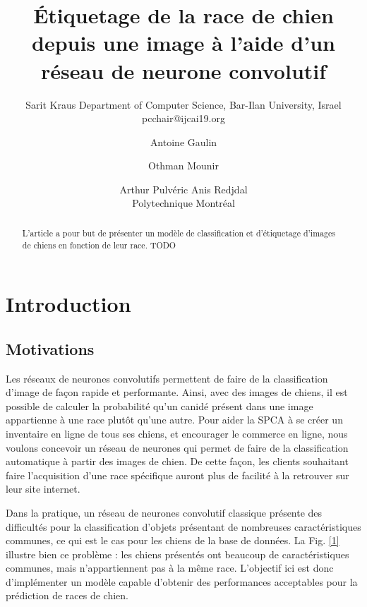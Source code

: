\documentclass{article}
\title{Étiquetage de la race de chien depuis une image à l'aide d'un réseau de neurone convolutif}
\author{
    Sarit Kraus
    \affiliations
    Department of Computer Science, Bar-Ilan University, Israel \emails
    pcchair@ijcai19.org
}
\author{
Antoine Gaulin\and
Othman Mounir\and
Arthur Pulvéric\And
Anis Redjdal\\
\affiliations
Polytechnique Montréal\\
}
\begin{document}
\maketitle

\begin{abstract}
L'article a pour but de présenter un modèle de classification et d'étiquetage 
d'images de chiens en fonction de leur race. TODO
\end{abstract}

\section{Introduction}

\subsection{Motivations}
Les réseaux de neurones convolutifs permettent de faire de la classification
d'image de façon rapide et performante. Ainsi, avec des images de chiens, il est
possible de calculer la probabilité qu'un canidé présent dans une image 
appartienne à une race plutôt qu’une autre. Pour aider la SPCA à se créer un
inventaire en ligne de tous ses chiens, et encourager le commerce en ligne, nous
voulons concevoir un réseau de neurones qui permet de faire de la classification
automatique à partir des images de chien. De cette façon, les clients souhaitant
faire l'acquisition d'une race spécifique auront plus de facilité à la retrouver
sur leur site internet.

Dans la pratique, un réseau de neurones convolutif classique présente des
difficultés pour la classification d’objets présentant de nombreuses
caractéristiques communes, ce qui est le cas pour les chiens de la base de 
données. La Fig. \ref{1} illustre bien ce problème : les chiens présentés ont
beaucoup de caractéristiques communes, mais n’appartiennent pas à la même race.
L’objectif ici est donc d’implémenter un modèle capable d’obtenir des
performances acceptables pour la prédiction de races de chien.
\end{document}
